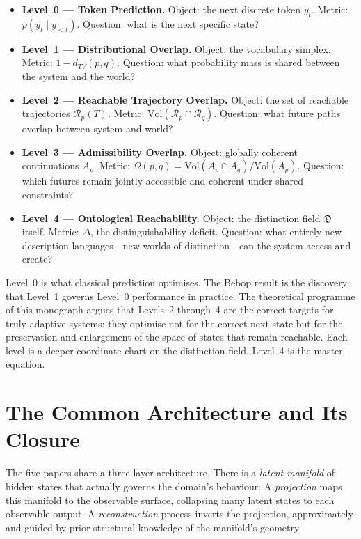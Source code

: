 \documentclass[12pt, letterpaper]{article}
\theoremstyle{remark}
\begin{document}
\begin{itemize}
  \item \textbf{Level~0 --- Token Prediction.} Object: the next discrete
    token $y_t$.  Metric: $p(y_t \mid y_{<t})$.  Question: what is the
    next specific state?
  \item \textbf{Level~1 --- Distributional Overlap.} Object: the vocabulary
    simplex.  Metric: $1 - d_{TV}(p, q)$.  Question: what probability mass
    is shared between the system and the world?
  \item \textbf{Level~2 --- Reachable Trajectory Overlap.} Object: the set
    of reachable trajectories $\mathcal{R}_p(T)$.  Metric:
    $\mathrm{Vol}(\mathcal{R}_p \cap \mathcal{R}_q)$.  Question: what future
    paths overlap between system and world?
  \item \textbf{Level~3 --- Admissibility Overlap.} Object: globally coherent
    continuations $A_p$.  Metric: $\Omega(p, q) = \mathrm{Vol}(A_p \cap
    A_q) / \mathrm{Vol}(A_p)$.  Question: which futures remain jointly
    accessible and coherent under shared constraints?
  \item \textbf{Level~4 --- Ontological Reachability.} Object: the
    distinction field $\mathfrak{D}$ itself.  Metric: $\Delta$, the
    distinguishability deficit.  Question: what entirely new description
    languages---new worlds of distinction---can the system access and create?
\end{itemize}

Level~0 is what classical prediction optimises.  The Bebop result is the
discovery that Level~1 governs Level~0 performance in practice.  The
theoretical programme of this monograph argues that Levels~2 through~4 are
the correct targets for truly adaptive systems: they optimise not for the
correct next state but for the preservation and enlargement of the space
of states that remain reachable.  Each level is a deeper coordinate chart
on the distinction field.  Level~4 is the master equation.

\section{The Common Architecture and Its Closure}

The five papers share a three-layer architecture.  There is a \emph{latent
manifold} of hidden states that actually governs the domain's behaviour.
A \emph{projection} maps this manifold to the observable surface, collapsing
many latent states to each observable output.  A \emph{reconstruction}
process inverts the projection, approximately and guided by prior structural
knowledge of the manifold's geometry.
\end{document}
